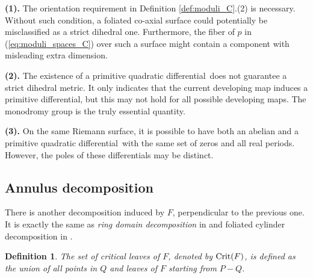 \documentclass[pdflatex,sn-mathphys]{sn-jnl}%
\numberwithin{equation}{section}
\theoremstyle{thmstyleone}%
\newtheorem{definition}[theorem]{Definition}
\newcommand{\qdf}{quadratic differential}
\begin{document}
\textbf{(1).} The orientation requirement in Definition \ref{def:moduli_C}.(2) is necessary. Without such condition, a foliated co-axial surface could potentially be misclassified as a strict dihedral one. Furthermore, the fiber of $p$ in (\ref{eq:moduli_spaces_C}) over such a surface might contain a component with misleading extra dimension. 

\textbf{(2).} The existence of a primitive \qdf\ does not guarantee a strict dihedral metric. It only indicates that the current developing map induces a primitive differential, but this may not hold for all possible developing maps. The monodromy group is the truly essential quantity. %

\textbf{(3).} On the same Riemann surface, it is possible to have both an abelian and a primitive \qdf\ with the same set of zeros and all real periods. However, the poles of these differentials may be distinct. 

\subsection{Annulus decomposition}
There is another decomposition induced by $F$, perpendicular to the previous one. It is exactly the same as \emph{ring domain decomposition} in \cite{Li19} and foliated cylinder decomposition in \cite{Erm20}.

\begin{definition}
    The set of critical leaves of $F$, denoted by $\mathrm{Crit}(F)$, is defined as the union of all points in $Q$ and leaves of $F$ starting from $P-Q$.
\end{definition}
\end{document}
